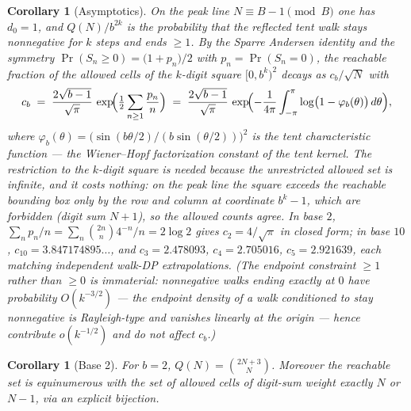 \documentclass[11pt]{article}
\newtheorem{corollary}[theorem]{Corollary}
\theoremstyle{remark}
\begin{document}
\begin{corollary}[Asymptotics]\label{cor:asym}
On the peak line $N\equiv B-1 \pmod B$ one has $d_0=1$, and
$Q(N)\big/b^{2k}$ is the probability that the reflected tent walk stays
nonnegative for $k$ steps and ends $\ge 1$. By the Sparre Andersen identity and
the symmetry $\Pr(S_n\ge0)=\bigl(1+p_n\bigr)/2$ with $p_n=\Pr(S_n=0)$, the
reachable fraction of the allowed cells \emph{of the $k$-digit square}
$[0,b^k)^2$ decays as $c_b/\sqrt{N}$ with
\[
c_b\;=\;\frac{2\sqrt{b-1}}{\sqrt{\pi}}\,
\exp\!\Bigl(\tfrac12\sum_{n\ge1}\frac{p_n}{n}\Bigr)
\;=\;\frac{2\sqrt{b-1}}{\sqrt{\pi}}\,
\exp\!\Bigl(-\frac{1}{4\pi}\int_{-\pi}^{\pi}
\log\bigl(1-\varphi_b(\theta)\bigr)\,d\theta\Bigr),
\]
where $\varphi_b(\theta)=\bigl(\sin(b\theta/2)/(b\sin(\theta/2))\bigr)^2$ is the
tent characteristic function --- the Wiener--Hopf factorization constant of the
tent kernel. The restriction to the $k$-digit square is needed because the
unrestricted allowed set is infinite, and it costs nothing: on the peak line
the square exceeds the reachable bounding box only by the row and column at
coordinate $b^k-1$, which are forbidden (digit sum $N+1$), so the allowed
counts agree. In base $2$, $\sum_n p_n/n=\sum_n\binom{2n}{n}4^{-n}/n=2\log2$
gives $c_2=4/\sqrt{\pi}$ in closed form; in base $10$,
$c_{10}=3.847174895\ldots$, and $c_3=2.478093$, $c_4=2.705016$,
$c_5=2.921639$, each matching independent walk-DP extrapolations. (The
endpoint constraint $\ge1$ rather than $\ge0$ is immaterial: nonnegative walks
ending exactly at $0$ have probability $O(k^{-3/2})$ --- the endpoint density
of a walk conditioned to stay nonnegative is Rayleigh-type and vanishes
linearly at the origin --- hence contribute $o(k^{-1/2})$ and do not affect
$c_b$.)
\end{corollary}

\begin{corollary}[Base 2]\label{cor:base2}
For $b=2$, $Q(N)=\binom{2N+3}{N}$. Moreover the reachable set is equinumerous
with the set of allowed cells of digit-sum weight exactly $N$ or $N-1$, via an
explicit bijection.
\end{corollary}
\end{document}
